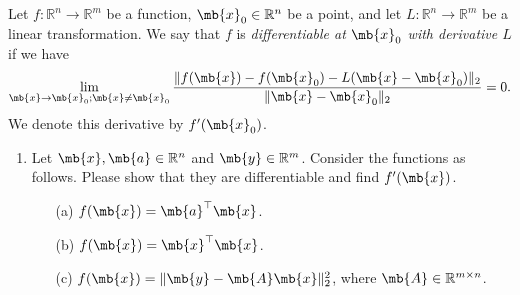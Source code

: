 \newpage
\begin{exercise}
	\begin{definition}[Differentiability]\cite{Tao}\label{def:diff}
		Let $f:\mathbb{R}^n\to\mathbb{R}^m$ be a function, $\mb{x}_0\in\mathbb{R}^n$ be a point, and let $L:\mathbb{R}^n\to\mathbb{R}^m$ be a linear transformation. We say that $f$ is \emph{differentiable at $\mb{x}_0$ with derivative $L$} if we have
		\begin{align*}
			\lim_{\mb{x}\to\mb{x}_0;\mb{x}\neq\mb{x}_0}\frac{\|f(\mb{x})-f(\mb{x}_0)-L(\mb{x}-\mb{x}_0)\|_2}{\|\mb{x}-\mb{x}_0\|_2}=0.
		\end{align*}
		We denote this derivative by $f'(\mb{x}_0)$.
	\end{definition}


	\begin{enumerate}
		\item Let $\mb{x},\mb{a}\in \mathbb{R}^n$ and $\mb{y}\in \mathbb{R}^m$. Consider the functions as follows. Please show that they are differentiable and find $f'(\mb{x})$.
			\begin{enumerate}
				\item[(a)] $f(\mb{x}) = \mb{a}^{\top}\mb{x}$.
				\item[(b)] $f(\mb{x}) = \mb{x}^{\top}\mb{x}$.
				\item[(c)] $f(\mb{x})=\| \mb{y} - \mb{A}\mb{x} \|_2^2$, where $\mb{A}\in\mathbb{R}^{m\times n}$.
			\end{enumerate}


\end{enumerate}
\end{exercise}
